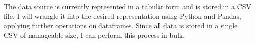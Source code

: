 \documentclass[sigconf, natbib=true]{acmart}
\begin{document}
The \citeauthor{untappd} data source is currently represented in a tabular form and is stored in a CSV file.
I will wrangle it into the desired representation using Python and Pandas, applying further operations on dataframes.
Since all data is stored in a single CSV of manageable size, I can perform this process in bulk.




\def\bibfont{\small} %
 
\end{document}
